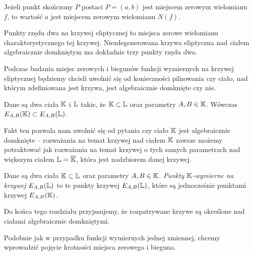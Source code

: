 \begin{corollary}\label{zero_of_norm_coro}
Jeżeli punkt skończony $P$ postaci $P = (a, b)$
jest miejscem zerowym wielomianu $f$,
to wartość $a$ jest miejscem zerowym wielomianu $N(f)$.
\end{corollary}

\begin{fact}
Punkty rzędu dwa na krzywej eliptycznej
to miejsca zerowe wielomianu charakterystycznego tej krzywej.
Niezdegenerowana krzywa eliptyczna nad ciałem algebraicznie domkniętym
ma dokładnie trzy punkty rzędu dwa.
\end{fact}

\noindent
Podczas badania miejsc zerowych i biegunów
funkcji wymiernych na krzywej eliptycznej
będziemy chcieli uwolnić się od konieczności pilnowania
czy ciało, nad którym zdefiniowana jest krzywa,
jest algebraicznie domknięte czy nie.

\begin{fact}
Dane są dwa ciała $\mathbb{K}$ i $\mathbb{L}$ takie, że $\mathbb{K} \subset \mathbb{L}$
oraz parametry $A,B \in \mathbb{K}$.
Wówczas $E_{A,B}(\mathbb{K}) \subset E_{A,B}(\mathbb{L})$.
\end{fact}

\noindent
Fakt ten pozwala nam uwolnić się od pytania
czy ciało $\mathbb{K}$ jest algebraicznie domknięte --
rozważania na temat krzywej nad ciałem $\mathbb{K}$
zawsze możemy potraktować
jak rozważania na temat krzywej o tych samych parametrach
nad większym ciałem $\mathbb{L} = \overline{\mathbb{K}}$,
która jest nadzbiorem danej krzywej.

\begin{definition}
Dane są dwa ciała $\mathbb{K} \subset \mathbb{L}$ oraz parametry $A, B \in \mathbb{K}$.
\emph{Punkty $\mathbb{K}$-wymierne na krzywej $E_{A,B}(\mathbb{L})$}
to te punkty krzywej $E_{A,B}(\mathbb{L})$,
które są jednocześnie punktami krzywej $E_{A,B}(\mathbb{K})$.
\end{definition}

\begin{remark}
Do końca tego rozdziału przyjmujemy,
że rozpatrywane krzywe są określone nad ciałami algebraicznie domkniętymi.
\end{remark}

\noindent
Podobnie jak w przypadku funkcji wymiernych jednej zmiennej,
chcemy wprowadzić pojęcie krotności miejsca zerowego i bieguna.

